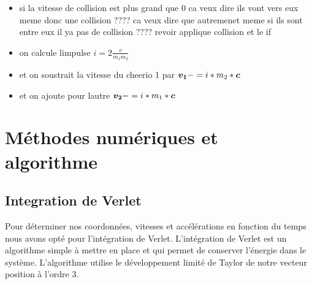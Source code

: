 \documentclass[a4paper, 11pt, oneside]{article} %
\begin{document}
        \begin{itemize}
            \item si la vitesse de collision est plus grand que 0 ca veux dire ils vont vers eux meme donc une collision ???? ca veux dire que autremenet meme si ils sont entre eux il ya pas de collision ???? revoir applique collision et le if
            \item on calcule limpulse $i = 2\frac{v}{m_1 m_2}$
            \item et on soustrait la vitesse du cheerio 1 par $\vb*{v_1} -= i*m_2*\vb*{c}$
            \item et on ajoute pour lautre $\vb*{v_2} -= i*m_1*\vb*{c}$
        \end{itemize} 
\section{Méthodes numériques et algorithme}
    \subsection{Integration de Verlet}
        Pour déterminer nos coordonnées, vitesses et accélérations en fonction du temps nous avons opté pour l'intégration de Verlet. L'intégration de Verlet est un algorithme simple à mettre en place et qui permet de conserver l'énergie dans le système. L'algorithme utilise le développement limité de Taylor de notre vecteur position à l'ordre 3.
\end{document}
